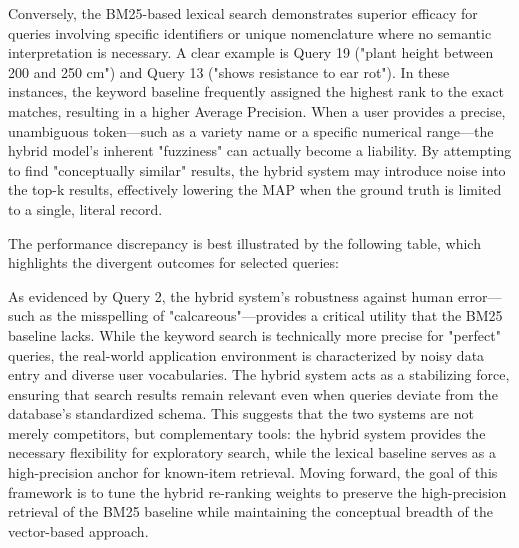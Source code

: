 \documentclass[journal]{./IEEE/IEEEtran}
\begin{document}
Conversely, the BM25-based lexical search demonstrates superior efficacy for queries involving specific identifiers or unique nomenclature where no semantic interpretation is necessary. A clear example is Query 19 ("plant height between 200 and 250 cm") and Query 13 ("shows resistance to ear rot"). In these instances, the keyword baseline frequently assigned the highest rank to the exact matches, resulting in a higher Average Precision. When a user provides a precise, unambiguous token—such as a variety name or a specific numerical range—the hybrid model’s inherent "fuzziness" can actually become a liability. By attempting to find "conceptually similar" results, the hybrid system may introduce noise into the top-k results, effectively lowering the MAP when the ground truth is limited to a single, literal record.

The performance discrepancy is best illustrated by the following table, which highlights the divergent outcomes for selected queries:

\begin{table}[htbp]
\caption{Comparison of Hybrid vs. Lexical Retrieval on Selected Queries}
\label{tab:query_comparison}
\centering
{}
\end{table}

As evidenced by Query 2, the hybrid system’s robustness against human error—such as the misspelling of "calcareous"—provides a critical utility that the BM25 baseline lacks. While the keyword search is technically more precise for "perfect" queries, the real-world application environment is characterized by noisy data entry and diverse user vocabularies. The hybrid system acts as a stabilizing force, ensuring that search results remain relevant even when queries deviate from the database’s standardized schema. This suggests that the two systems are not merely competitors, but complementary tools: the hybrid system provides the necessary flexibility for exploratory search, while the lexical baseline serves as a high-precision anchor for known-item retrieval. Moving forward, the goal of this framework is to tune the hybrid re-ranking weights to preserve the high-precision retrieval of the BM25 baseline while maintaining the conceptual breadth of the vector-based approach.
\end{document}
